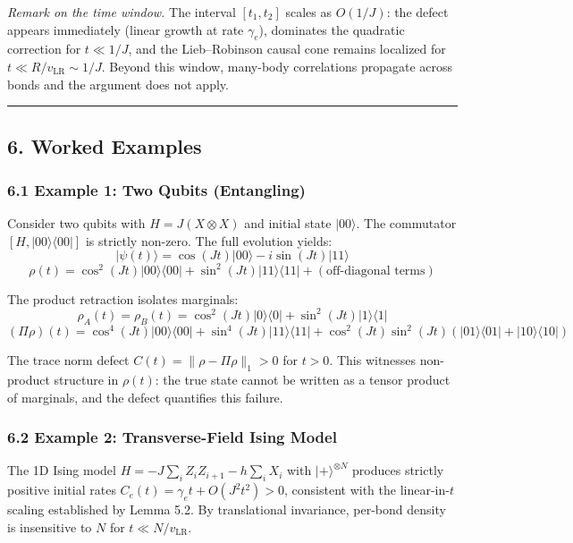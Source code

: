\documentclass[
]{article}
\begin{document}
\emph{Remark on the time window.} The interval \([t_1, t_2]\) scales as
\(O(1/J)\): the defect appears immediately (linear growth at rate
\(\gamma_e\)), dominates the quadratic correction for \(t \ll 1/J\), and
the Lieb--Robinson causal cone remains localized for
\(t \ll R/v_{\text{LR}} \sim 1/J\). Beyond this window, many-body
correlations propagate across bonds and the argument does not apply.

\begin{center}\rule{0.5\linewidth}{0.5pt}\end{center}

\subsection{6. Worked Examples}\label{worked-examples}

\subsubsection{6.1 Example 1: Two Qubits
(Entangling)}\label{example-1-two-qubits-entangling}

Consider two qubits with \(H = J(X \otimes X)\) and initial state
\(|{00}\rangle\). The commutator \([H, |00\rangle\langle00|]\) is
strictly non-zero. The full evolution yields:
\[|\psi(t)\rangle = \cos(Jt)|{00}\rangle - i\sin(Jt)|{11}\rangle\]
\[\rho(t) = \cos^2(Jt)|{00}\rangle\langle{00}| + \sin^2(Jt)|{11}\rangle\langle{11}| + (\text{off-diagonal terms})\]

The product retraction isolates marginals:
\[\rho_A(t) = \rho_B(t) = \cos^2(Jt)|{0}\rangle\langle{0}| + \sin^2(Jt)|{1}\rangle\langle{1}|\]
\[(\Pi\rho)(t) = \cos^4(Jt)|{00}\rangle\langle{00}| + \sin^4(Jt)|{11}\rangle\langle{11}| + \cos^2(Jt)\sin^2(Jt)(|{01}\rangle\langle{01}| + |{10}\rangle\langle{10}|)\]

The trace norm defect \(C(t) = \|\rho - \Pi\rho\|_1 > 0\) for \(t > 0\).
This witnesses non-product structure in \(\rho(t)\): the true state
cannot be written as a tensor product of marginals, and the defect
quantifies this failure.

\subsubsection{6.2 Example 2: Transverse-Field Ising
Model}\label{example-2-transverse-field-ising-model}

The 1D Ising model \(H = -J\sum_i Z_i Z_{i+1} - h\sum_i X_i\) with
\(|{+}\rangle^{\otimes N}\) produces strictly positive initial rates
\(C_e(t) = \gamma_e t + O(J^2 t^2) > 0\), consistent with the
linear-in-\(t\) scaling established by Lemma 5.2. By translational
invariance, per-bond density is insensitive to \(N\) for
\(t \ll N/v_{\text{LR}}\).
\end{document}
